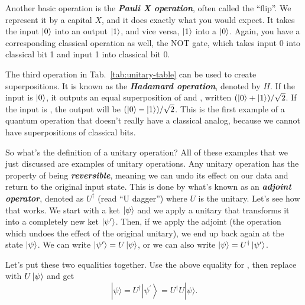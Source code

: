 
Another basic operation is the \textbf{\emph{Pauli X operation}}, often called the ``flip''. We represent it by a capital $X$, and it does exactly what you would expect. It takes the input $\left| 0 \right\rangle$ into an output $\left| 1 \right\rangle$, and vice versa, $\left| 1 \right\rangle$ into a $\left| 0 \right\rangle$. Again, you have a corresponding classical operation as well, the NOT gate, which takes input 0 into classical bit 1 and input 1 into classical bit 0.

The third operation in Tab.~\ref{tab:unitary-table} can be used to create superpositions. It is known as the \textbf{\emph{Hadamard operation}}, denoted by $H$. If the input is $\left| 0 \right\rangle$, it outputs an equal superposition of  and , written $(\left| 0 \right\rangle+\left| 1 \right\rangle)/\sqrt{2}$. If the input is , the output will be $(\left| 0 \right\rangle-\left| 1 \right\rangle)/\sqrt{2}$. This is the first example of a quantum operation that doesn't really have a classical analog, because we cannot have superpositions of classical bits.

So what's the definition of a unitary operation? All of these examples that we just discussed are examples of unitary operations. Any unitary operation has the property of being \textbf{\emph{reversible}}, meaning we can undo its effect on our data and return to the original input state. This is done by what's known as an \textbf{\emph{adjoint operator}}, denoted as $U^\dagger$ (read ``U dagger'') where $U$ is the unitary.
Let's see how that works. We start with a ket $\left| \psi \right\rangle$ and we apply a unitary that transforms it into a completely new ket $\left| \psi' \right\rangle$. Then, if we apply the adjoint (the operation which undoes the effect of the original unitary), we end up back again at the state $\left| \psi \right\rangle$. We can write $\left| \psi' \right\rangle = U\left| \psi \right\rangle$, or we can also write $\left| \psi \right\rangle = U^\dagger\left| \psi' \right\rangle$. 

Let's put these two equalities together. Use the above equality for \ket{\psi}, then replace  with $U\left| \psi \right\rangle$ and get
\begin{equation}
|\psi\rangle=U^{\dagger}\left|\psi^{\prime}\right\rangle=U^{\dagger} U|\psi\rangle.
\end{equation} 



